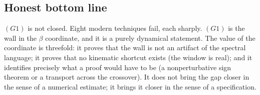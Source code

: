 \subsection{Honest bottom line}

$(G1)$ is not closed. Eight modern techniques fail, each sharply. $(G1)$ is the wall in the
$\beta$ coordinate, and it is a purely dynamical statement. The value of the coordinate is
threefold: it proves that the wall is not an artifact of the spectral language; it proves that
no kinematic shortcut exists (the window is real); and it identifies precisely what a proof
would have to be (a nonperturbative sign theorem or a transport across the crossover). It does
not bring the gap closer in the sense of a numerical estimate; it brings it closer in the sense
of a specification.
